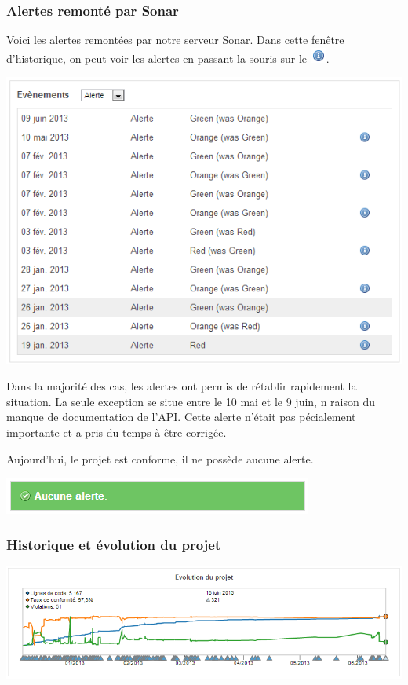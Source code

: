 \documentclass{report}
\begin{document}
\subsubsection{Alertes remonté par Sonar}

Voici les alertes remontées par notre serveur Sonar. Dans cette fenêtre
d’historique, on peut voir les alertes en passant la souris sur le
\includegraphics[scale=0.8]{images/info_icon}.

\includegraphics[scale=0.8]{images/alert1}

Dans la majorité des cas, les alertes ont permis de rétablir rapidement
la situation. La seule exception se situe entre le 10 mai et le 9 juin,
n raison du manque de documentation de l’API. Cette alerte n’était pas
pécialement importante et a pris du temps à être corrigée.

Aujourd’hui, le projet est conforme, il ne possède aucune alerte.

\includegraphics{images/alert2}

\subsubsection{Historique et évolution du projet}

\includegraphics[scale=0.55]{images/evolution}
\end{document}
